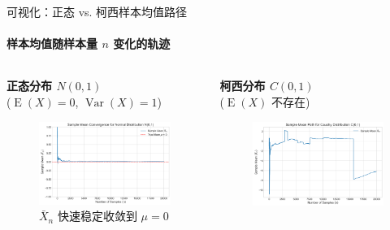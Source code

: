 \documentclass[UTF8]{beamer}
\DeclareMathOperator{\E}{\operatorname{E}}
\DeclareMathOperator{\Var}{\operatorname{Var}}
\begin{document}
\begin{frame}[shrink=10]{可视化：正态 vs. 柯西样本均值路径}
    \framesubtitle{样本均值随样本量 $n$ 变化的轨迹}
    \begin{columns}[T] %
        \begin{column}{0.5\textwidth}
            \centering
            \textbf{正态分布 $N(0,1)$}\\($\E(X)=0$, $\Var(X)=1$)
            \begin{figure}
                \includegraphics[width=\linewidth]{normal_mean_convergence.png}
                \caption{$\bar{X}_n$ 快速稳定收敛到 $\mu=0$}
            \end{figure}
        \end{column}
        \begin{column}{0.5\textwidth}
            \centering
            \textbf{柯西分布 $C(0,1)$}\\($\E(X)$ 不存在)
            \begin{figure}
                \includegraphics[width=\linewidth]{cauchy_mean_no_convergence.png}

\end{figure}
\end{column}
\end{columns}
\end{frame}
\end{document}
